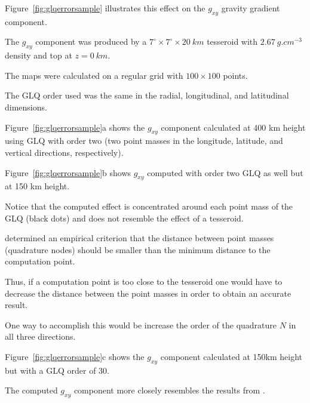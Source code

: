 \documentclass[paper,twocolumn]{geophysics}
\begin{document}
Figure~\ref{fig:glqerrorsample}
illustrates this effect on the $g_{xy}$ gravity gradient component.

The $g_{xy}$ component was produced by a
$7^\circ \times 7^\circ \times 20\ km$ tesseroid
with $2.67\ g.cm^{-3}$ density
and top at $z=0\ km$.

The maps were calculated on a regular grid
with $100\times100$ points.

The GLQ order used was the same
in the radial, longitudinal, and latitudinal dimensions.

Figure~\ref{fig:glqerrorsample}a shows the $g_{xy}$ component
calculated at 400 km height using
GLQ with order two (two point masses in the longitude, latitude, and vertical
directions, respectively).

Figure~\ref{fig:glqerrorsample}b shows $g_{xy}$ computed with order two
GLQ as well but at 150 km height.

Notice that the computed effect is concentrated around each point mass
of the GLQ (black dots) and does not resemble the effect of a tesseroid.

\citet{Ku1977} determined an empirical criterion that the distance between
point masses (quadrature nodes) should be smaller than the minimum distance to
the computation point.

Thus, if a computation point is too close to the tesseroid one would have to
decrease the distance between the point masses in order to obtain an accurate
result.

One way to accomplish this would be increase the order of the quadrature
$N$ in all three directions.

Figure~\ref{fig:glqerrorsample}c shows the $g_{xy}$ component calculated at
150km height but with a GLQ order of 30.

The computed $g_{xy}$ component more closely resembles the results from
\citet{Asgharzadeh2007}.
\end{document}
